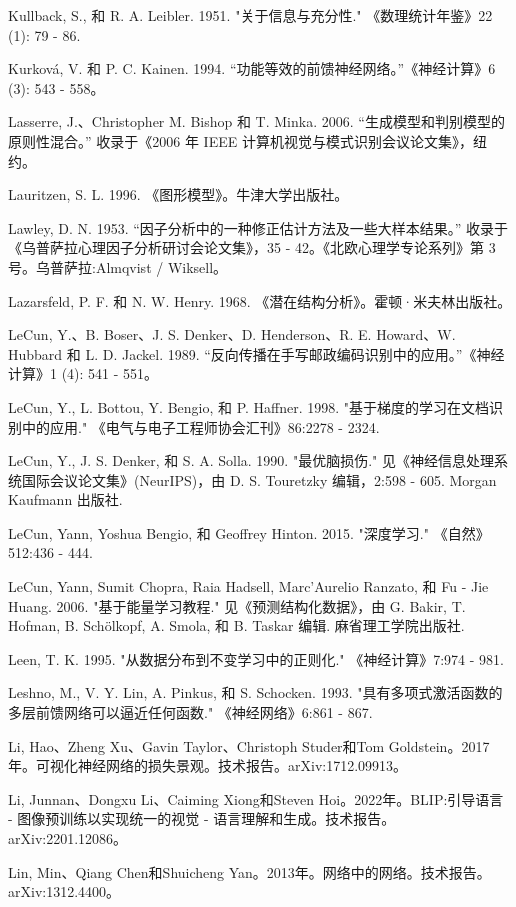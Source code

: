 \documentclass[10pt]{article}
\begin{document}
Kullback, S., 和 R. A. Leibler. 1951. "关于信息与充分性." 《数理统计年鉴》22 (1): 79 - 86.

Kurková, V. 和 P. C. Kainen. 1994. “功能等效的前馈神经网络。”《神经计算》6 (3): 543 - 558。

Lasserre, J.、Christopher M. Bishop 和 T. Minka. 2006. “生成模型和判别模型的原则性混合。” 收录于《2006 年 IEEE 计算机视觉与模式识别会议论文集》，纽约。

Lauritzen, S. L. 1996. 《图形模型》。牛津大学出版社。

Lawley, D. N. 1953. “因子分析中的一种修正估计方法及一些大样本结果。” 收录于《乌普萨拉心理因子分析研讨会论文集》，35 - 42。《北欧心理学专论系列》第 3 号。乌普萨拉:Almqvist / Wiksell。

Lazarsfeld, P. F. 和 N. W. Henry. 1968. 《潜在结构分析》。霍顿·米夫林出版社。

LeCun, Y.、B. Boser、J. S. Denker、D. Henderson、R. E. Howard、W. Hubbard 和 L. D. Jackel. 1989. “反向传播在手写邮政编码识别中的应用。”《神经计算》1 (4): 541 - 551。

LeCun, Y., L. Bottou, Y. Bengio, 和 P. Haffner. 1998. "基于梯度的学习在文档识别中的应用." 《电气与电子工程师协会汇刊》86:2278 - 2324.

LeCun, Y., J. S. Denker, 和 S. A. Solla. 1990. "最优脑损伤." 见《神经信息处理系统国际会议论文集》(NeurIPS)，由 D. S. Touretzky 编辑，2:598 - 605. Morgan Kaufmann 出版社.

LeCun, Yann, Yoshua Bengio, 和 Geoffrey Hinton. 2015. "深度学习." 《自然》512:436 - 444.

LeCun, Yann, Sumit Chopra, Raia Hadsell, Marc'Aurelio Ranzato, 和 Fu - Jie Huang. 2006. "基于能量学习教程." 见《预测结构化数据》，由 G. Bakir, T. Hofman, B. Schölkopf, A. Smola, 和 B. Taskar 编辑. 麻省理工学院出版社.

Leen, T. K. 1995. "从数据分布到不变学习中的正则化." 《神经计算》7:974 - 981.

Leshno, M., V. Y. Lin, A. Pinkus, 和 S. Schocken. 1993. "具有多项式激活函数的多层前馈网络可以逼近任何函数." 《神经网络》6:861 - 867.

Li, Hao、Zheng Xu、Gavin Taylor、Christoph Studer和Tom Goldstein。2017年。可视化神经网络的损失景观。技术报告。arXiv:1712.09913。

Li, Junnan、Dongxu Li、Caiming Xiong和Steven Hoi。2022年。BLIP:引导语言 - 图像预训练以实现统一的视觉 - 语言理解和生成。技术报告。arXiv:2201.12086。

Lin, Min、Qiang Chen和Shuicheng Yan。2013年。网络中的网络。技术报告。arXiv:1312.4400。
\end{document}
